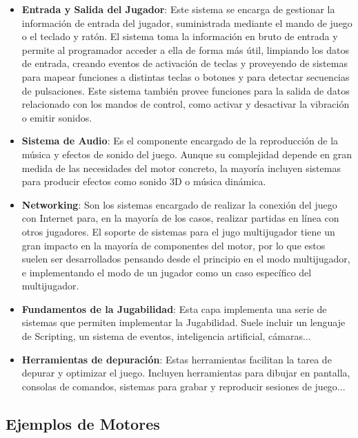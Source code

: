 \begin{itemize}
\item\textbf{Entrada y Salida del Jugador}: Este sistema se encarga de gestionar la información de entrada del jugador, suministrada mediante el mando de juego o el teclado y ratón. El sistema toma la información en bruto de entrada y permite al programador acceder a ella de forma más útil, limpiando los datos de entrada, creando eventos de activación de teclas y proveyendo de sistemas para mapear funciones a distintas teclas o botones y para detectar secuencias de pulsaciones. Este sistema también provee funciones para la salida de datos relacionado con los mandos de control, como activar y desactivar la vibración o emitir sonidos.
\item\textbf{Sistema de Audio}: Es el componente encargado de la reproducción de la música y efectos de sonido del juego. Aunque su complejidad depende en gran medida de las necesidades del motor concreto, la mayoría incluyen sistemas para producir efectos como sonido 3D o música dinámica.
\item\textbf{Networking}: Son los sistemas encargado de realizar la conexión del juego con Internet para, en la mayoría de los casos, realizar partidas en línea con otros jugadores. El soporte de sistemas para el jugo multijugador tiene un gran impacto en la mayoría de componentes del motor, por lo que estos suelen ser desarrollados pensando desde el principio en el modo multijugador, e implementando el modo de un jugador como un caso específico del multijugador.
\item\textbf{Fundamentos de la Jugabilidad}: Esta capa implementa una serie de sistemas que permiten implementar la Jugabilidad. Suele incluir un lenguaje de Scripting, un sistema de eventos, inteligencia artificial, cámaras...
\item\textbf{Herramientas de depuración}: Estas herramientas facilitan la tarea de depurar y optimizar el juego. Incluyen herramientas para dibujar en pantalla, consolas de comandos, sistemas para grabar y reproducir sesiones de juego...
\end{itemize}

\subsection{Ejemplos de Motores}

